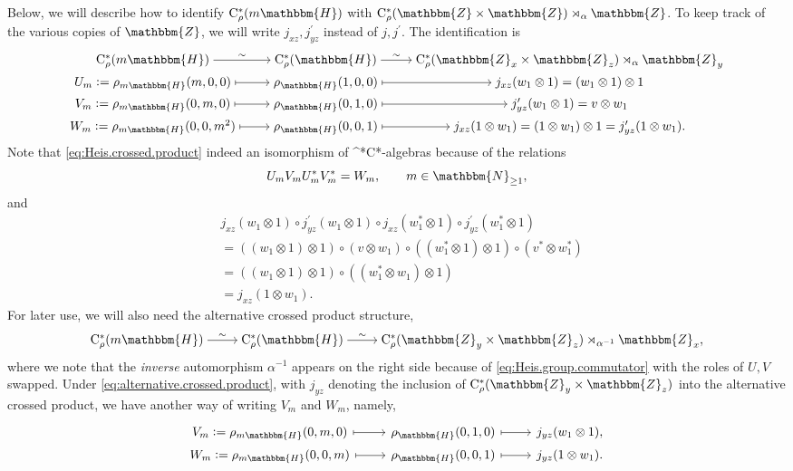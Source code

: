 \documentclass{amsart}
\numberwithin{figure}{section}
\numberwithin{equation}{section}
\numberwithin{table}{section}
\theoremstyle{plain}
\theoremstyle{definition}
\theoremstyle{remark}
\theoremstyle{nonumber}
\newcommand{\N}{\mathbb{N}}
\newcommand{\Z}{\mathbb{Z}}
\newcommand{\HH}{\mathbb{H}} %
\newcommand{\Cst}{\relax\ifmmode\mathrm{C}^*\else\textup{C*}\fi}
\newcommand{\Cstr}{\Cst_\rho} %
\newcommand{\defeq}{\mathrel{\vcentcolon=}}
\renewcommand{\mathbb}{\mathbbm} %
\begin{document}
Below, we will describe how to identify $\Cstr(m\HH)$ with
$\Cstr(\Z\times\Z)\rtimes_\alpha\Z$. To keep track of the various copies of
$\Z$, we will write $j_{xz}, j^\prime_{yz}$ instead of $j, j^\prime$.
The identification is
\begin{equation}\label{eq:Heis.crossed.product}
\begin{tikzcd}[cramped, row sep=0]
\Cstr(m\HH)\ar[r,"\sim"] & \Cstr(\HH)\ar[r,"\sim"] &  \Cstr(\Z_x\times\Z_z)\rtimes_{\alpha}\Z_y\\
U_m\defeq \rho_{m\HH}(m,0,0)\ar[r,mapsto] & \rho_\HH(1,0,0)\ar[r,mapsto] & j_{xz}(w_1\otimes 1)=(w_1\otimes 1)\otimes 1\\
V_m\defeq \rho_{m\HH}(0,m,0)\ar[r,mapsto] & \rho_\HH(0,1,0)\ar[r,mapsto] & j^\prime_{yz}(w_1\otimes 1)=v\otimes w_1\\
W_m\defeq \rho_{m\HH}(0,0,m^2) \ar[r,mapsto] & \rho_\HH(0,0,1)\ar[r,mapsto] & j_{xz}(1\otimes w_1)=(1\otimes w_1)\otimes 1=j^\prime_{yz}(1\otimes w_1).
\end{tikzcd}
\end{equation}
Note that \eqref{eq:Heis.crossed.product} indeed an isomorphism of
\Cst-algebras because of the relations
\begin{equation}\label{eq:Heis.group.commutator}
U_mV_mU_m^*V_m^*=W_m,\qquad m\in \N_{\geq 1},
\end{equation}
and
\begin{align*}
&j_{xz}(w_1\otimes 1)\circ j^\prime_{yz}(w_1\otimes 1)\circ j_{xz}(w_1^*\otimes 1) \circ j^\prime_{yz}(w_1^*\otimes 1)\\
&=((w_1\otimes 1)\otimes 1)\circ (v\otimes w_1)\circ  ((w_1^*\otimes 1)\otimes 1)\circ (v^*\otimes w_1^*)\\
&=((w_1\otimes 1)\otimes 1)\circ ((w_1^*\otimes w_1)\otimes 1)\\
&=j_{xz}(1\otimes w_1).
\end{align*}
For later use, we will also need the alternative crossed product structure,
\begin{equation}\label{eq:alternative.crossed.product}
\begin{tikzcd}[cramped]
\Cstr(m\HH)\ar[r,"\sim"] & \Cstr(\HH)\ar[r,"\sim"] & \Cstr(\Z_y\times\Z_z)\rtimes_{\alpha^{-1}}\Z_x,
\end{tikzcd}
\end{equation}
where we note that the \emph{inverse} automorphism $\alpha^{-1}$ appears on
the right side because of \eqref{eq:Heis.group.commutator} with the roles
of $U,V$ swapped. Under \eqref{eq:alternative.crossed.product}, with
$j_{yz}$ denoting the inclusion of $\Cstr(\Z_y\times\Z_z)$ into the
alternative crossed product, we
have another way of writing $V_m$ and $W_m$, namely,
\begin{equation}\label{eq:Vm.in.alternative.crossed.product}
\begin{tikzcd}[row sep=0]
V_m \defeq\rho_{m\HH}(0,m,0) \arrow[r, mapsto] & \rho_{\HH}(0,1,0)
\arrow[r, mapsto] & j_{yz}(w_1\otimes 1), \\
W_m \defeq\rho_{m\HH}(0,0,m) \arrow[r, mapsto] & \rho_{\HH}(0,0,1)
\arrow[r, mapsto] & j_{yz}(1\otimes w_1).
\end{tikzcd}
\end{equation}
\end{document}
